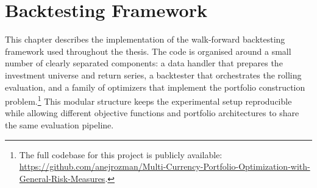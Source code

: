 \chapter{Backtesting Framework}


This chapter describes the implementation of the walk-forward backtesting framework used throughout the thesis. The code is organised around a small number of clearly separated components: a data handler that prepares the investment universe and return series, a backtester that orchestrates the rolling evaluation, and a family of optimizers that implement the portfolio construction problem.\footnote{The full codebase for this project is publicly available: \url{https://github.com/anejrozman/Multi-Currency-Portfolio-Optimization-with-General-Risk-Measures}.} This modular structure keeps the experimental setup reproducible while allowing different objective functions and portfolio architectures to share the same evaluation pipeline.

